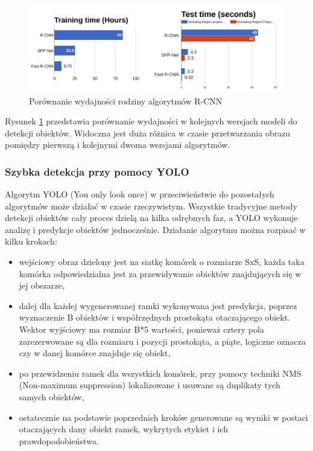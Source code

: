 \begin{figure}[H]
	\centering
	\includegraphics[width=15cm]{pages/teoria/zdjecia/RCNNvsFRCNNPorownanie.png}
	\caption{Porównanie wydajności rodziny algorytmów R-CNN \cite{rcnnAndFRCNNTowards}}
	\label{rys:porownanieRCNN}
\end{figure}
Rysunek \ref{rys:porownanieRCNN} przedstawia porównanie wydajności w kolejnych wersjach modeli do detekcji obiektów. 
Widoczna jest duża różnica w czasie przetwarzania obrazu pomiędzy pierwszą i kolejnymi dwoma wersjami algorytmów.

\subsubsection{Szybka detekcja przy pomocy YOLO}

Algorytm YOLO (You only look once) w przeciwieństwie do pozostałych algorytmów może działać w czasie rzeczywistym.
Wszystkie tradycyjne metody detekcji obiektów cały proces dzielą na kilka odrębnych faz, a YOLO wykonuje analizę i predykcje obiektów jednocześnie.
Działanie algorytmu można rozpisać w kilku krokach: 
\begin{itemize}
	\item  wejściowy obraz dzielony jest na siatkę komórek o rozmiarze SxS, 
	każda taka komórka odpowiedzialna jest za przewidywanie obiektów znajdujących się w jej obszarze,
	\item dalej dla każdej wygenerowanej ramki wykonywana jest predykcja,
	poprzez wyznaczenie B obiektów i współrzędnych prostokąta otaczającego obiekt. 
	Wektor wyjściowy ma rozmiar B*5 wartości, ponieważ cztery pola zarezerwowane są dla rozmiaru i pozycji prostokąta, a 
	piąte, logiczne oznacza czy w danej komórce znajduje się obiekt,
	\item po przewidzeniu ramek dla wszystkich komórek, przy pomocy techniki NMS (Non-maximum suppression) lokalizowane i usuwane 
	są duplikaty tych samych obiektów,
	\item ostatecznie na podstawie poprzednich kroków generowane są wyniki w postaci otaczających dany obiekt ramek, wykrytych etykiet i ich prawdopodobieństwa.
\end{itemize}

